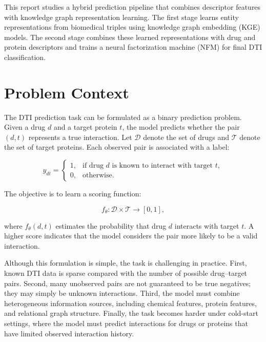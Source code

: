 This report studies a hybrid prediction pipeline that combines descriptor
features with knowledge graph representation learning. The first stage learns
entity representations from biomedical triples using knowledge graph embedding
(KGE) models. The second stage combines these learned representations with drug
and protein descriptors and trains a neural factorization machine (NFM) for
final DTI classification.

\section{Problem Context}

The DTI prediction task can be formulated as a binary prediction problem. Given
a drug $d$ and a target protein $t$, the model predicts whether the pair
$(d,t)$ represents a true interaction. Let $\mathcal{D}$ denote the set of
drugs and $\mathcal{T}$ denote the set of target proteins. Each observed pair is
associated with a label:

\begin{equation}
    y_{dt} =
    \begin{cases}
        1, & \text{if drug } d \text{ is known to interact with target } t, \\
        0, & \text{otherwise.}
    \end{cases}
\end{equation}

The objective is to learn a scoring function:

\begin{equation}
    f_{\theta}: \mathcal{D} \times \mathcal{T} \rightarrow [0,1],
\end{equation}

where $f_{\theta}(d,t)$ estimates the probability that drug $d$ interacts with
target $t$. A higher score indicates that the model considers the pair more
likely to be a valid interaction.

Although this formulation is simple, the task is challenging in practice. First,
known DTI data is sparse compared with the number of possible drug--target
pairs. Second, many unobserved pairs are not guaranteed to be true negatives;
they may simply be unknown interactions. Third, the model must combine
heterogeneous information sources, including chemical features, protein
features, and relational graph structure. Finally, the task becomes harder under
cold-start settings, where the model must predict interactions for drugs or
proteins that have limited observed interaction history.

